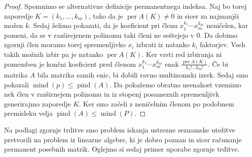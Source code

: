 \documentclass[12pt,a4paper,twoside]{article}
\theoremstyle{definition} %
\theoremstyle{plain} %
\numberwithin{equation}{section}  %
\DeclareMathOperator{\per}{per}
\DeclareMathOperator{\mind}{mind}
\DeclareMathOperator{\pind}{pind}
\begin{document}
\begin{proof}
Spomnimo se alternativne definicije permanentnega indeksa. Naj bo torej zaporedje $K = (k_1, \ldots, k_m)$, tako da je $\per A(K) \neq 0$ in sicer za najmanjši možen $k$. Sedaj želimo pokazati, da je koeficient pri členu $x_1^{k_1}\cdots x_m^{k_m}$ neničelen, kar pomeni, da se v razširejenem polinomu taki členi ne seštejejo v $0$. Da dobimo zgornji člen moramo torej spremenljivko $x_i$ izbrati iz natanko $k_i$ faktorjev. Vseh takih možnih izbir pa je natanko $\per A(K)$. Ker vrsti red izbiranja ni pomemben je končni koeficient pred členom  $x_1^{k_1}\cdots x_m^{k_m}$ enak $\frac{\per A(K)}{k_1!\ldots k_m!}$. Če bi matrika $A$ bila matrika samih enic, bi dobili ravno multinomski izrek. Sedaj smo pokazali $\mind(p) \le \pind(A)$. Da pokažemo obratno neenakost vzemimo nek člen v razširnejem polinomu in iz stopenj posameznih spremenljivk generirajmo zaporedje $K$. Ker smo začeli z neničelnim členom po podobnem premisleku velja $\pind(A) \le \mind(P)$.
\end{proof}
Na podlagi zgornje trditve smo problem iskanja ustrezne seznamske utežitve pretvorili na problem iz linearne algebre, ki je dobro poznan in sicer računanje permanent posebnih matrik. Oglejmo si sedaj primer uporabe zgornje trditve.
\end{document}
